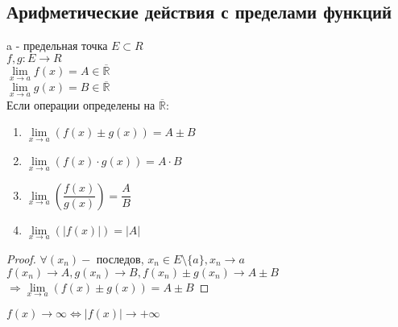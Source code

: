 \subsection{Арифметические действия с пределами функций}

a - предельная точка $ E \subset R $ \\
$ f, g : E \rightarrow R $ \\
$ \lim\limits_{x \rightarrow a} f(x) = A \in \overline{\mathbb{R}} $\\
$ \lim\limits_{x \rightarrow a} g(x) = B \in \overline{\mathbb{R}} $\\
Если операции определены на $ \overline{\mathbb{R}}$:
\begin{enumerate}
	\item $ \lim\limits_{x \rightarrow a} (f(x) \pm g(x)) = A \pm B $
	\item $  \lim\limits_{x \rightarrow a} (f(x) \cdot g(x)) = A \cdot B $
	\item $  \lim\limits_{x \rightarrow a} (\dfrac{f(x)}{g(x)}) = \dfrac{A}{B} $ 
	\item $  \lim\limits_{x \rightarrow a} (|f(x)|) = |A| $
\end{enumerate}
\begin{proof}
	$ \forall (x_n) - $ последов, $ x_n \in E \setminus \{a\} , x_n \rightarrow a $ \\
	$ f(x_n) \rightarrow A, g(x_n) \rightarrow B,  f(x_n) \pm g(x_n) \rightarrow A \pm B $\\
	$ \Rightarrow \lim\limits_{x \rightarrow a} (f(x) \pm g(x)) = A \pm B $
\end{proof}
$ f(x) \rightarrow \infty \Leftrightarrow |f(x)| \rightarrow +\infty $\\


